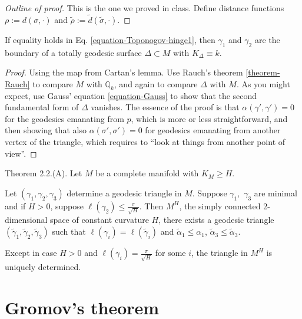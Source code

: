 \begin{proof}[Outline of proof]
This is the one we proved in class. Define distance functions
$\rho:=d(\sigma,\cdot)$ and $\tilde{\rho}:=\tilde{d}(\tilde{\sigma},\cdot)$.
\end{proof}

\begin{lemma}
\label{lemma-equality-Toponogov}
If equality holds in Eq. \ref{equation-Toponogov-hinge1}, then $\gamma_1$ and
$\gamma_2$ are the boundary of a totally geodesic surface $\Delta \subset M$ 
with $K_\Delta \equiv k$.
\end{lemma}

\begin{proof}
Using the map from Cartan's lemma. Use Rauch's theorem \ref{theorem-Rauch} to
compare $M$ with $\mathbb{Q}_k$, and again to compare $\Delta$ with $M$. As you
might expect, use Gauss' equation \ref{equation-Gauss} to show that the second
fundamental form of $\Delta$ vanishes. The essence of the proof is that
$\alpha(\gamma',\gamma')=0$ for the geodesics emanating from $p$, which is more
or less straightforward, and then showing that also $\alpha(\sigma',\sigma')=0$
for geodesics emanating from another vertex of the triangle, which requires to
``look at things from another point of view''.
\end{proof}

\begin{theorem}
\label{theorem-Toponogov-angle}
\cite{Cheeger-Ebin} Theorem 2.2.(A). Let $M$ be a complete manifold with 
$K_M\geq H$.

Let $(\gamma_1,\gamma_2,\gamma_3)$ determine a geodesic triangle in $M$. Suppose
$\gamma_1,$ $\gamma_3$ are minimal and if $H>0$, suppose $\ell(\gamma_2)\leq
\frac{\pi}{\sqrt{H}}$. Then $M^H$, the simply connected 2-dimensional space of
constant curvature $H$, there exists a geodesic triangle
$(\tilde{\gamma}_1,\tilde{\gamma}_2,\tilde{\gamma}_3)$ such that
$\ell(\gamma_i)=\ell(\tilde{\gamma}_i)$ and $\tilde{\alpha}_1 \leq\alpha_1$,
$\tilde{\alpha}_3 \leq \tilde{\alpha}_3$.

Except in case $H>0$ and $\ell(\gamma_i)=\frac{\pi}{\sqrt{H}}$ for some $i$, the
triangle in $M^H$ is uniquely determined.
\end{theorem}

\section{Gromov's theorem}
\label{section-Gromov-theorem}

